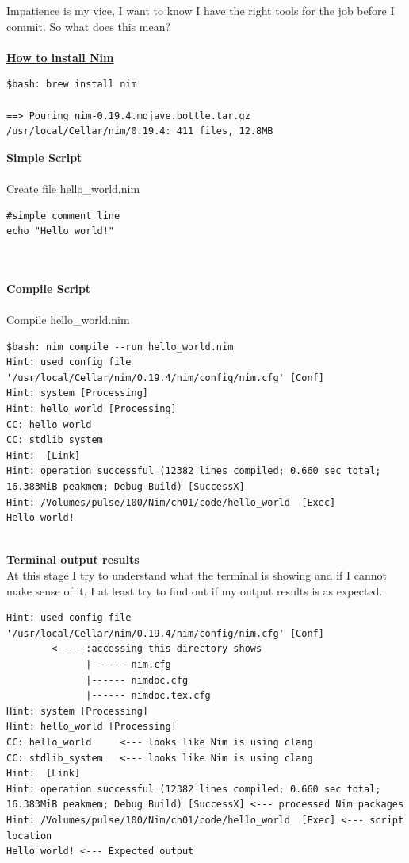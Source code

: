 \documentclass[10pt, a4paper, twocolumn]{article} %
\begin{document}
Impatience is my vice, I want to know I have the right tools for the job before I commit. So what does this mean?
\\
\\
\textbf{\href{https://exercism.io/tracks/nim/installation}{How to install Nim}}
\\
\begin{lstlisting}
$bash: brew install nim

==> Pouring nim-0.19.4.mojave.bottle.tar.gz
/usr/local/Cellar/nim/0.19.4: 411 files, 12.8MB
\end{lstlisting}
\newpage
\textbf{Simple Script}
\\
\\
Create file hello\_world.nim
\begin{lstlisting}
#simple comment line
echo "Hello world!"
\end{lstlisting}
\\
\\
\textbf{Compile Script}
\\
\\
Compile hello\_world.nim
\begin{lstlisting}
$bash: nim compile --run hello_world.nim
Hint: used config file '/usr/local/Cellar/nim/0.19.4/nim/config/nim.cfg' [Conf]
Hint: system [Processing]
Hint: hello_world [Processing]
CC: hello_world
CC: stdlib_system
Hint:  [Link]
Hint: operation successful (12382 lines compiled; 0.660 sec total; 16.383MiB peakmem; Debug Build) [SuccessX]
Hint: /Volumes/pulse/100/Nim/ch01/code/hello_world  [Exec]
Hello world!
\end{lstlisting}
\\
\textbf{Terminal output results}
\\
At this stage I try to understand what the terminal is showing and if I cannot make sense of it, I at least try to find out if my output results is as expected.
\begin{lstlisting}
Hint: used config file '/usr/local/Cellar/nim/0.19.4/nim/config/nim.cfg' [Conf]
		<---- :accessing this directory shows
			  |------ nim.cfg
			  |------ nimdoc.cfg
			  |------ nimdoc.tex.cfg
Hint: system [Processing]
Hint: hello_world [Processing]
CC: hello_world 	<--- looks like Nim is using clang
CC: stdlib_system	<--- looks like Nim is using clang
Hint:  [Link]
Hint: operation successful (12382 lines compiled; 0.660 sec total; 16.383MiB peakmem; Debug Build) [SuccessX] <--- processed Nim packages
Hint: /Volumes/pulse/100/Nim/ch01/code/hello_world  [Exec] <--- script location
Hello world! <--- Expected output
\end{lstlisting}
\end{document}

